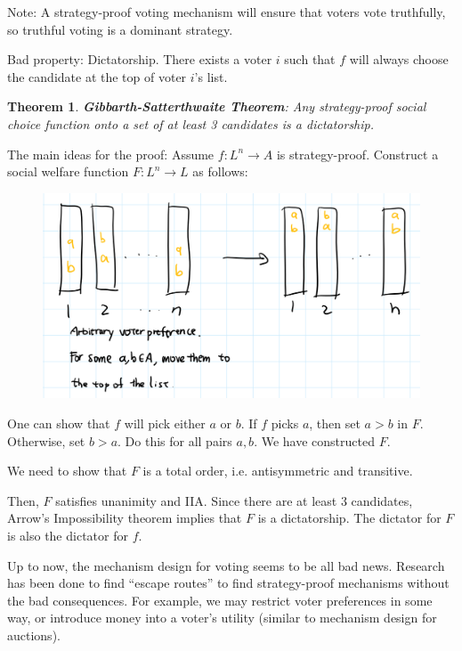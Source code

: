\documentclass[twoside]{article}
\newcounter{lecnum}
\newtheorem{prototheorem}{Theorem}[lecnum]
\newenvironment{theorem}
{\colorlet{shadecolor}{orange!15}\begin{shaded}\begin{prototheorem}\normalfont}
		{\end{prototheorem}\end{shaded}}
\begin{document}
	Note: A strategy-proof voting mechanism will ensure that voters vote truthfully, so truthful voting is a dominant strategy. 
	
	Bad property: Dictatorship. There exists a voter $i$ such that $f$ will always choose the candidate at the top of voter $i$'s list. 
	
	\begin{theorem}
		\textbf{Gibbarth-Satterthwaite Theorem}: Any strategy-proof social choice function onto a set of at least 3 candidates is a dictatorship. 
	\end{theorem}
	
	The main ideas for the proof: Assume $f: L^n \rightarrow A$ is strategy-proof. Construct a social welfare function $F: L^n \rightarrow L$ as follows: 
	\begin{center}
		\begin{figure}[h!]
			\includegraphics[width=\textwidth]{voting_6.png}
		\end{figure}
	\end{center}
	One can show that $f$ will pick either $a$ or $b$. If $f$ picks $a$, then set $a > b$ in $F$. Otherwise, set $b > a$. Do this for all pairs $a, b$. We have constructed $F$. 
	
	We need to show that $F$ is a total order, i.e. antisymmetric and transitive. 
	
	Then, $F$ satisfies unanimity and IIA. Since there are at least 3 candidates, Arrow's Impossibility theorem implies that $F$ is a dictatorship. The dictator for $F$ is also the dictator for $f$. 
	
	Up to now, the mechanism design for voting seems to be all bad news. Research has been done to find ``escape routes'' to find strategy-proof mechanisms without the bad consequences. For example, we may restrict voter preferences in some way, or introduce money into a voter's utility (similar to mechanism design for auctions). 
\end{document}

